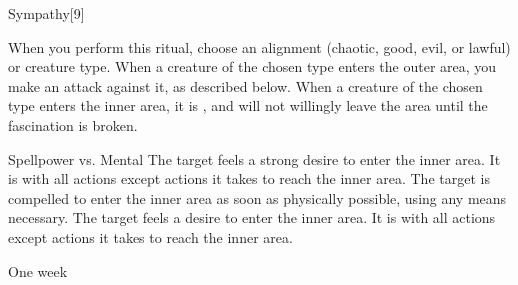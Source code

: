 \begin{spellsection}{Sympathy}[9]
    \begin{spellheader}
    \end{spellheader}
    \begin{spellcontent}
        \begin{spelltargetinginfo}
            \spellrng{\rngclose}
        \end{spelltargetinginfo}
        \begin{spelleffects}
            \spellspecial When you perform this ritual, choose an alignment (chaotic, good, evil, or lawful) or creature type.
            \spelleffect When a creature of the chosen type enters the outer area, you make an attack against it, as described below.
            When a creature of the chosen type enters the inner area, it is \fascinated, and will not willingly leave the area until the fascination is broken.
            \begin{spellattack}{Spellpower vs. Mental}
                \spellsuccess The target feels a strong desire to enter the inner area.
                It is \severelyimpaired with all actions except actions it takes to reach the inner area.
                \spellcritical The target is compelled to enter the inner area as soon as physically possible, using any means necessary.
                \spellfailure The target feels a desire to enter the inner area.
                It is \impaired with all actions except actions it takes to reach the inner area.
            \end{spellattack}
            \spelldur One week
        \end{spelleffects}
    \end{spellcontent}
    \begin{spellfooter}
    \end{spellfooter}
    \begin{spellaugments}
    \end{spellaugments}
\end{spellsection}

